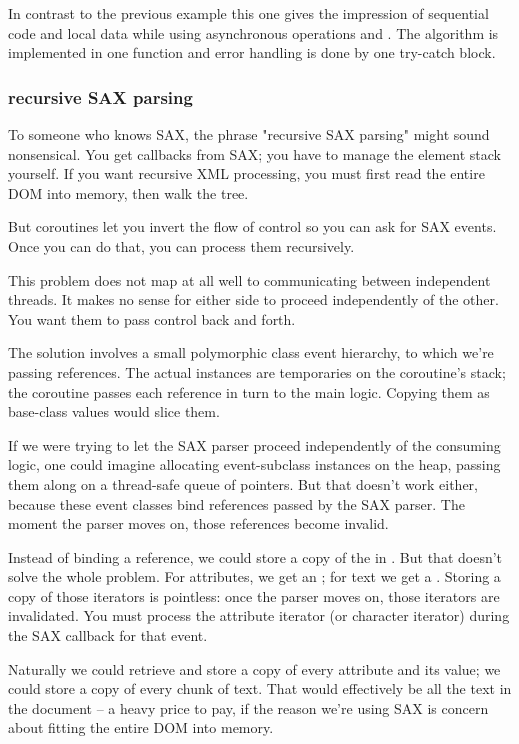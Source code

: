 In contrast to the previous example this one gives the impression of sequential
code and local data while using asynchronous operations \asyncread and
\asyncwrite. The algorithm is implemented in one function and error handling is
done by one try-catch block.

\subsubsection*{recursive SAX parsing}
To someone who knows SAX, the phrase "recursive SAX parsing" might sound
nonsensical. You get callbacks from SAX; you have to manage the element stack
yourself. If you want recursive XML processing, you must first read the entire
DOM into memory, then walk the tree.

But coroutines let you invert the flow of control so you can ask for SAX
events. Once you can do that, you can process them recursively.


This problem does not map at all well to communicating between independent
threads. It makes no sense for either side to proceed independently of the
other. You want them to pass control back and forth.

The solution involves a small polymorphic class event hierarchy, to which
we're passing references. The actual instances are temporaries on the
coroutine's stack; the coroutine passes each reference in turn to the main
logic. Copying them as base-class values would slice them.

If we were trying to let the SAX parser proceed independently of the consuming
logic, one could imagine allocating event-subclass instances on the heap,
passing them along on a thread-safe queue of pointers. But that doesn't work
either, because these event classes bind references passed by the SAX parser.
The moment the parser moves on, those references become invalid.

Instead of binding a  reference, we could store a copy of
the  in . But that doesn't solve the whole
problem. For attributes, we get an ; for text we get
a . Storing a copy of those iterators is pointless: once
the parser moves on, those iterators are invalidated. You must process the
attribute iterator (or character iterator) during the SAX callback for that
event.

Naturally we could retrieve and store a copy of every attribute and its value;
we could store a copy of every chunk of text. That would effectively be all
the text in the document -- a heavy price to pay, if the reason we're using
SAX is concern about fitting the entire DOM into memory.

